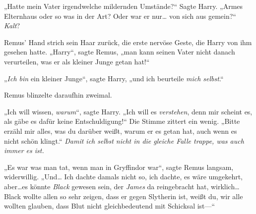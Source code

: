 „Hatte mein Vater irgendwelche mildernden Umstände?“ Sagte Harry. „Armes Elternhaus oder so was in der Art? Oder war er nur… von sich aus gemein?“ \emph{Kalt}?

Remus' Hand strich sein Haar zurück, die erste nervöse Geste, die Harry von ihm gesehen hatte. „Harry“, sagte Remus, „man kann seinen Vater nicht danach verurteilen, was er als kleiner Junge getan hat!“

„\emph{Ich bin} ein kleiner Junge“, sagte Harry, „und ich beurteile \emph{mich selbst}.“

Remus blinzelte daraufhin zweimal.

„Ich will wissen, \emph{warum}“, sagte Harry. „Ich will es \emph{verstehen}, denn mir scheint es, als gäbe es dafür keine Entschuldigung!“ Die Stimme zittert ein wenig. „Bitte erzähl mir alles, was du darüber weißt, warum er es getan hat, auch wenn es nicht schön klingt.“ \emph{Damit ich selbst nicht in die gleiche Falle trappe, was auch immer es ist.}

„Es war was man tat, wenn man in Gryffindor war“, sagte Remus langsam, widerwillig. „Und… Ich dachte damals nicht so, ich dachte, es wäre umgekehrt, aber…es könnte \emph{Black} gewesen sein, der \emph{James} da reingebracht hat, wirklich…Black wollte allen so sehr zeigen, dass er gegen Slytherin ist, weißt du, wir alle wollten glauben, dass Blut nicht gleichbedeutend mit Schicksal ist—“

\later

